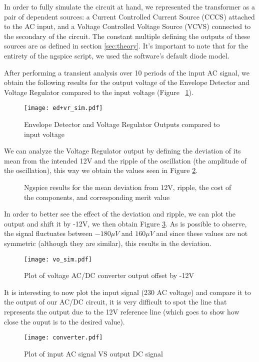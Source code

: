 \hspace{12pt} In order to fully simulate the circuit at hand, we represented the transformer as a pair of dependent sources: a Current Controlled Current Source (CCCS) attached to the AC input, and a Voltage Controlled Voltage Source (VCVS) connected to the secondary of the circuit. The constant multiple defining the outputs of these sources are as defined in section \ref{sec:theory}. It's important to note that for the entirety of the ngspice script, we used the software's default diode model.

After performing a transient analysis over 10 periods of the input AC signal, we obtain the following results for the output voltage of the Envelope Detector and Voltage Regulator compared to the input voltage (Figure ~\ref{fig:ed_vr}).

\begin{figure}[h]
	\centering
        \texttt{[image: ed+vr\_sim.pdf]}
        \caption{Envelope Detector and Voltage Regulator Outputs compared to input voltage}
        \label{fig:ed_vr}
\end{figure}
\pagebreak
\vspace{12pt}
We can analyze the Voltage Regulator output by defining the deviation of its mean from the intended 12V and the ripple of the oscillation (the amplitude of the oscillation), this way we obtain the values seen in Figure \ref{fig:sim_results}.

\begin{figure}[h]
	\centering
	\caption{Ngspice results for the mean deviation from 12V, ripple, the cost of the components, and corresponding merit value}
	\label{fig:sim_results}
\end{figure}

\pagebreak
In order to better see the effect of the deviation and ripple, we can plot the output and shift it by -12V, we then obtain Figure \ref{fig:sim_vo}. As is possible to observe, the signal fluctuates between $-180 \mu V$ and $160 \mu V$ and since these values are not symmetric (although they are similar), this results in the deviation.

\begin{figure}[h]
	\centering
	\texttt{[image: vo\_sim.pdf]}
	\caption{Plot of voltage AC/DC converter output offset by -12V}
	\label{fig:sim_vo}
\end{figure}

It is interesting to now plot the input signal (230 AC voltage) and compare it to the output of our AC/DC circuit, it is very difficult to spot the line that represents the output due to the 12V reference line (which goes to show how close the ouput is to the desired value). 

\begin{figure}[h]
	\centering
	\texttt{[image: converter.pdf]}
	\caption{Plot of input AC signal VS output DC signal}
	\label{fig:sim_converter}
\end{figure}
\pagebreak

